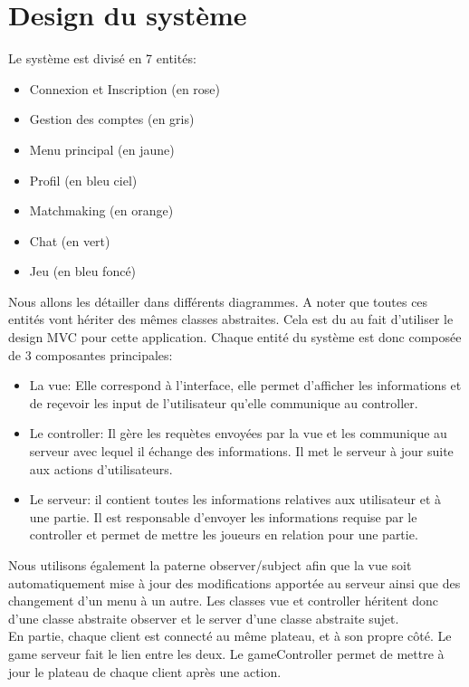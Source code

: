 \documentclass[../design_fonctionnement_sys.tex]{subfiles}
\begin{document}
\section{Design du système}
Le système est divisé en 7 entités:
\begin{itemize}
    \item Connexion et Inscription (en rose)
    \item Gestion des comptes (en gris)
    \item Menu principal (en jaune)
    \item Profil (en bleu ciel)
    \item Matchmaking (en orange)
    \item Chat (en vert)
    \item Jeu (en bleu foncé)
    \newline
\end{itemize}

Nous allons les détailler dans différents diagrammes. A noter que toutes ces entités vont hériter des mêmes classes abstraites.
Cela est du au fait d'utiliser le design MVC pour cette application.
Chaque entité du système est donc composée de 3 composantes principales:
\begin{itemize}
    \item La vue: Elle correspond à l'interface, elle permet d'afficher les informations 
    et de reçevoir les input de l'utilisateur qu'elle communique au controller.
    \item Le controller: Il gère les requètes envoyées par la vue et les communique au serveur avec lequel il échange des informations.
    Il met le serveur à jour suite aux actions d'utilisateurs.
    \item Le serveur: il contient toutes les informations relatives aux utilisateur et à une partie. 
    Il est responsable d'envoyer les informations requise par le controller et permet de mettre les joueurs en relation pour une partie.\\
\end{itemize}

Nous utilisons également la paterne observer/subject afin que la vue soit 
automatiquement mise à jour des modifications apportée au serveur ainsi que des changement d'un menu à un autre.
Les classes vue et controller héritent donc d'une classe abstraite observer et le server d'une classe abstraite sujet.\\
En partie, chaque client est connecté au même plateau, et à son propre côté. Le game serveur fait le lien entre les deux.
Le gameController permet de mettre à jour le plateau de chaque client après une action.
\end{document}
